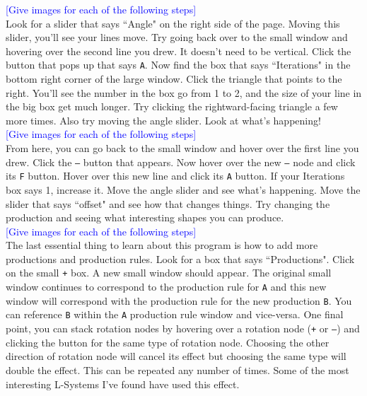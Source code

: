 \documentclass[12pt,twoside]{reedthesis}
\newcommand{\code}[1]{\texttt{#1}}
\begin{document}
	\textcolor{blue}{[Give images for each of the following steps]}\\
	
	Look for a slider that says ``Angle" on the right side of the page. Moving this slider, you'll see your lines move. Try going back over to the small window and hovering over the second line you drew. It doesn't need to be vertical. Click the button that pops up that says \code{A}. Now find the box that says ``Iterations" in the bottom right corner of the large window. Click the triangle that points to the right. You'll see the number in the box go from 1 to 2, and the size of your line in the big box get much longer. Try clicking the rightward-facing triangle a few more times. Also try moving the angle slider. Look at what's happening!\\
	
	\textcolor{blue}{[Give images for each of the following steps]}\\
	
	From here, you can go back to the small window and hover over the first line you drew. Click the \code{–} button that appears. Now hover over the new \code{–} node and click its \code{F} button. Hover over this new line and click its \code{A} button. If your Iterations box says 1, increase it. Move the angle slider and see what's happening. Move the slider that says ``offset" and see how that changes things. Try changing the production and seeing what interesting shapes you can produce.\\
	
	\textcolor{blue}{[Give images for each of the following steps]}\\
	
	The last essential thing to learn about this program is how to add more productions and production rules. Look for a box that says ``Productions". Click on the small \code{+} box. A new small window should appear. The original small window continues to correspond to the production rule for \code{A} and this new window will correspond with the production rule for the new production \code{B}. You can reference \code{B} within the \code{A} production rule window and vice-versa. One final point, you can stack rotation nodes by hovering over a rotation node (\code{+} or \code{–}) and clicking the button for the same type of rotation node. Choosing the other direction of rotation node will cancel its effect but choosing the same type will double the effect. This can be repeated any number of times. Some of the most interesting L-Systems I've found have used this effect.\\
	
\end{document}
